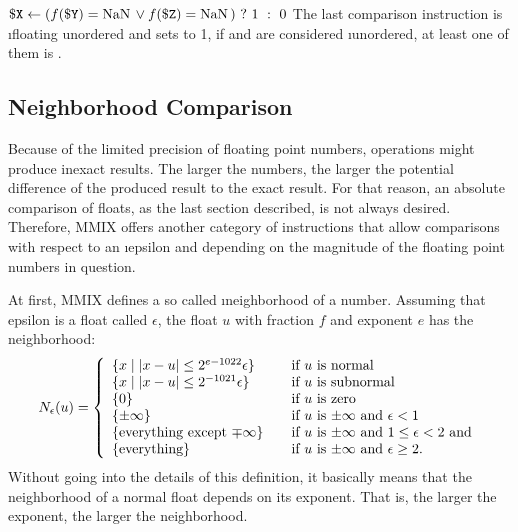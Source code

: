 \instrtbl
	{}
	{${\tt \$X} \leftarrow (f({\tt \$Y}) = {\rm NaN}\, \lor f({\tt \$Z}) = {\rm NaN}\,)~?~1~:~0$}
\noindent The last comparison instruction is \i{floating unordered} and sets  to 1, if  and  are considered \i{unordered}, \ie at least one of them is \NaN. \citep[pg. 17]{mmix-doc}

\subsection{Neighborhood Comparison}

Because of the limited precision of floating point numbers, operations might produce inexact results. The larger the numbers, the larger the potential difference of the produced result to the exact result. For that reason, an absolute comparison of floats, as the last section described, is not always desired. Therefore, MMIX offers another category of instructions that allow comparisons with respect to an \i{epsilon} and depending on the magnitude of the floating point numbers in question.

At first, MMIX defines a so called \i{neighborhood} of a number. Assuming that epsilon is a float called $\epsilon$, the float $u$ with fraction $f$ and exponent $e$ has the neighborhood:
\[
	N_\epsilon(u) = \left\{
	\begin{array}{l l}
		\{x \mid |x-u| \le 2^{e-1022}\epsilon\}
			& \quad \text{if $u$ is normal}\\
		\{x \mid |x-u| \le 2^{-1021}\epsilon\}
			& \quad \text{if $u$ is subnormal}\\
		\{0\}
			& \quad \text{if $u$ is zero}\\
		\{\pm \infty\}
			& \quad \text{if $u$ is $\pm \infty$ and $\epsilon < 1$}\\
		\{\text{everything except $\mp \infty$}\}
			& \quad \text{if $u$ is $\pm \infty$ and $1 \le \epsilon < 2$ and}\\
		\{\text{everything}\}
			& \quad \text{if $u$ is $\pm \infty$ and $\epsilon \ge 2$.}\\
	\end{array} \right.
\]
\citep[pg. 19]{mmix-doc} Without going into the details of this definition, it basically means that the neighborhood of a normal float depends on its exponent. That is, the larger the exponent, the larger the neighborhood.

